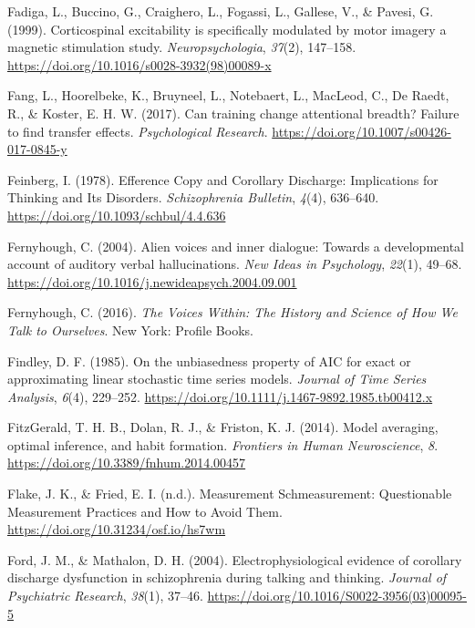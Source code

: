 \documentclass[a4paper,12pt,twoside,onecolumn,openright,final,oldfontcommands]{memoir}
\begin{document}
\leavevmode\hypertarget{ref-fadiga_corticospinal_1999}{}%
Fadiga, L., Buccino, G., Craighero, L., Fogassi, L., Gallese, V., \& Pavesi, G. (1999). Corticospinal excitability is specifically modulated by motor imagery a magnetic stimulation study. \emph{Neuropsychologia}, \emph{37}(2), 147--158. \url{https://doi.org/10.1016/s0028-3932(98)00089-x}

\leavevmode\hypertarget{ref-fang_can_2017}{}%
Fang, L., Hoorelbeke, K., Bruyneel, L., Notebaert, L., MacLeod, C., De Raedt, R., \& Koster, E. H. W. (2017). Can training change attentional breadth? Failure to find transfer effects. \emph{Psychological Research}. \url{https://doi.org/10.1007/s00426-017-0845-y}

\leavevmode\hypertarget{ref-feinberg_efference_1978}{}%
Feinberg, I. (1978). Efference Copy and Corollary Discharge: Implications for Thinking and Its Disorders. \emph{Schizophrenia Bulletin}, \emph{4}(4), 636--640. \url{https://doi.org/10.1093/schbul/4.4.636}

\leavevmode\hypertarget{ref-fernyhough_alien_2004}{}%
Fernyhough, C. (2004). Alien voices and inner dialogue: Towards a developmental account of auditory verbal hallucinations. \emph{New Ideas in Psychology}, \emph{22}(1), 49--68. \url{https://doi.org/10.1016/j.newideapsych.2004.09.001}

\leavevmode\hypertarget{ref-fernyhough_voices_2016}{}%
Fernyhough, C. (2016). \emph{The Voices Within: The History and Science of How We Talk to Ourselves}. New York: Profile Books.

\leavevmode\hypertarget{ref-findley_unbiasedness_1985}{}%
Findley, D. F. (1985). On the unbiasedness property of AIC for exact or approximating linear stochastic time series models. \emph{Journal of Time Series Analysis}, \emph{6}(4), 229--252. \url{https://doi.org/10.1111/j.1467-9892.1985.tb00412.x}

\leavevmode\hypertarget{ref-fitzgerald_model_2014}{}%
FitzGerald, T. H. B., Dolan, R. J., \& Friston, K. J. (2014). Model averaging, optimal inference, and habit formation. \emph{Frontiers in Human Neuroscience}, \emph{8}. \url{https://doi.org/10.3389/fnhum.2014.00457}

\leavevmode\hypertarget{ref-flake_measurement_2019}{}%
Flake, J. K., \& Fried, E. I. (n.d.). Measurement Schmeasurement: Questionable Measurement Practices and How to Avoid Them. \url{https://doi.org/10.31234/osf.io/hs7wm}

\leavevmode\hypertarget{ref-ford_electrophysiological_2004}{}%
Ford, J. M., \& Mathalon, D. H. (2004). Electrophysiological evidence of corollary discharge dysfunction in schizophrenia during talking and thinking. \emph{Journal of Psychiatric Research}, \emph{38}(1), 37--46. \url{https://doi.org/10.1016/S0022-3956(03)00095-5}
\end{document}
